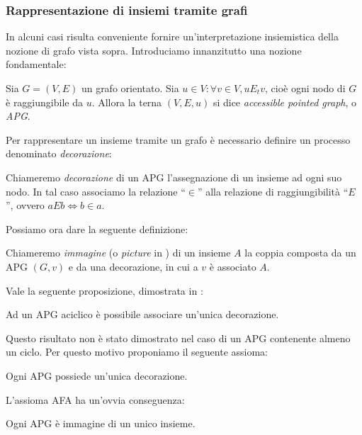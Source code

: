 
\subsubsection{Rappresentazione di insiemi tramite grafi}
\label{sec:graphs_sets}
In alcuni casi risulta conveniente fornire un'in\-ter\-pre\-ta\-zio\-ne insiemistica della nozione di grafo vista sopra. Introduciamo innanzitutto una nozione fondamentale:
\begin{definition}
    Sia $G = (V, E)$ un grafo orientato. Sia $u \in V : \forall v \in V, u E_t v$, cioè ogni nodo di $G$ è raggiungibile da $u$. Allora la terna $(V, E, u)$ si dice \emph{accessible pointed graph}, o \emph{APG}.
\end{definition}
Per rappresentare un insieme tramite un grafo è necessario definire un processo denominato \emph{decorazione}:
\begin{definition}
    Chiameremo \emph{decorazione} di un APG l'assegnazione di un insieme ad ogni suo nodo. In tal caso associamo la relazione ``$\in$'' alla relazione di raggiungibilità ``$E$'', ovvero $aEb \iff b \in a$.
\end{definition}
Possiamo ora dare la seguente definizione:
\begin{definition}
    Chiameremo \emph{immagine} (o \emph{picture} in \cite{aczel}) di un insieme $A$ la coppia composta da un APG $(G,v)$ e da una decorazione, in cui a $v$ è associato $A$.
\end{definition}
Vale la seguente proposizione, dimostrata in \cite{aczel}:
\begin{proposition}
    Ad un APG aciclico è possibile associare un'unica decorazione.
\end{proposition}
Questo risultato non è stato dimostrato nel caso di un APG contenente almeno un ciclo. Per questo motivo proponiamo il seguente assioma:
\begin{axiom}
    Ogni APG possiede un'unica decorazione.
\end{axiom}
L'assioma AFA ha un'ovvia conseguenza:
\begin{corollary}
    Ogni APG è immagine di un unico insieme.
\end{corollary}
